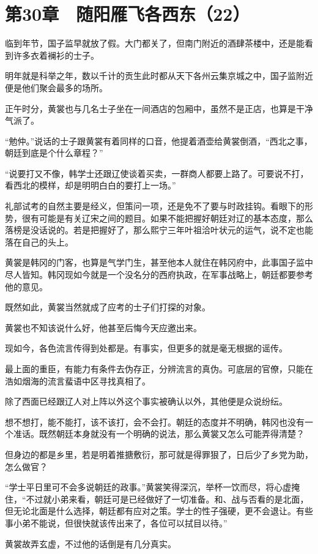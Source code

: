 \section{第30章　随阳雁飞各西东（22）}

临到年节，国子监早就放了假。大门都关了，但南门附近的酒肆茶楼中，还是能看到许多衣着襕衫的士子。

明年就是科举之年，数以千计的贡生此时都从天下各州云集京城之中，国子监附近便是他们聚会最多的场所。

正午时分，黄裳也与几名士子坐在一间酒店的包厢中，虽然不是正店，也算是干净气派了。

“勉仲。”说话的士子跟黄裳有着同样的口音，他提着酒壶给黄裳倒酒，“西北之事，朝廷到底是个什么章程？”

“说要打又不像，韩学士还跟辽使谈着买卖，一群商人都要上路了。可要说不打，看西北的模样，却是明明白白的要打上一场。”

礼部试考的自然主要是经义，但策问一项，还是免不了要与时政挂钩。看眼下的形势，很有可能是有关辽宋之间的题目。如果不能把握好朝廷对辽的基本态度，那么落榜是没话说的。若是把握好了，那么熙宁三年叶祖洽叶状元的运气，说不定也能落在自己的头上。

黄裳是韩冈的门客，也算是气学门生，甚至他本人就住在韩冈府中，此事国子监中尽人皆知。韩冈现如今就是一个没名分的西府执政，在军事战略上，朝廷都要参考他的意见。

既然如此，黄裳当然就成了应考的士子们打探的对象。

黄裳也不知该说什么好，他甚至后悔今天应邀出来。

现如今，各色流言传得到处都是。有事实，但更多的就是毫无根据的谣传。

最上面的重臣，有能力有条件去伪存正，分辨流言的真伪。可底层的官僚，只能在浩如烟海的流言蜚语中区寻找真相了。

除了西面已经跟辽人对上阵以外这个事实被确认以外，其他便是众说纷纭。

想不想打，能不能打，该不该打，会不会打。朝廷的态度并不明确，韩冈也没有一个准话。既然朝廷本身就没有一个明确的说法，那么黄裳又怎么可能弄得清楚？

但身边的都是乡里，若是明着推搪敷衍，那可就是得罪狠了，日后少了乡党为助，怎么做官？

“学士平日里可不会多说朝廷的政事。”黄裳笑得深沉，举杯一饮而尽，将心虚掩住，“不过就小弟来看，朝廷可是已经做好了一切准备。和、战与否看的是北面，但无论北面是什么选择，朝廷都有应对之策。学士的性子强硬，更不会退让。有些事小弟不能说，但很快就该传出来了，各位可以拭目以待。”

黄裳故弄玄虚，不过他的话倒是有几分真实。

